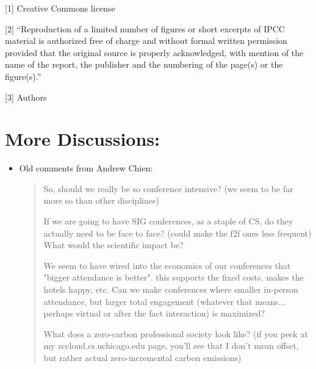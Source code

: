 \documentclass[12pt]{article}
\begin{document}
[1] Creative Commons license

[2] ``Reproduction of a limited number of figures or short excerpts of IPCC material is authorized free of charge and without formal written permission provided that the original source is properly acknowledged, with mention of the name of the report, the publisher and the numbering of the page(s) or the figure(s).''

[3] Authors


\section*{More Discussions:}
\begin{itemize}
\item Old comments from Andrew Chien:
\begin{quote}
So, should we really be so conference intensive? (we seem to be far more so than other disciplines)

If we are going to have SIG conferences, as a staple of CS, do they actually need to be face to face?  (could
make the f2f ones less frequent)  What would the scientific impact be?

We seem to have wired into the economics of our conferences that "bigger attendance is better".  this supports
the fixed costs, makes the hotels happy, etc.  Can we make conferences where smaller in-person attendance, but
larger total engagement (whatever that means... perhaps virtual or after the fact interaction) is maximized?

What does a zero-carbon professional society look like?  (if you peek at my zccloud.cs.uchicago.edu page, you'll
see that I don't mean offset, but rather actual zero-incremental carbon emissions)


\end{quote}
\end{itemize}
\end{document}
